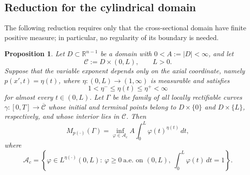 \documentclass[12pt]{amsart}
\numberwithin{equation}{section}
\theoremstyle{plain}
\newtheorem{proposition}[equation]{Proposition}
\theoremstyle{definition}
\begin{document}
\subsection{Reduction for the cylindrical domain}
\label{sec:cylinder}
The following reduction requires only that the cross-sectional domain
have finite positive measure; in particular, no regularity of its
boundary is needed.
\begin{proposition}
\label{prop:cylinder}
Let $D\subset\mathbb R^{n-1}$ be a domain with
$0<A:=|D|<\infty$,
and let
\begin{equation*}
\mathcal C:=D\times(0,L),
\qquad L>0.
\end{equation*}
Suppose that the variable exponent depends only on the axial
coordinate, namely
$p(x',t)=\eta(t)$,
where $\eta:(0,L)\to(1,\infty)$ is measurable and satisfies
\begin{equation}
\label{eq:cylinder_exp_bounds}
1<\eta^-\le \eta(t)\le \eta^+<\infty
\end{equation}
for almost every $t\in(0,L)$.
Let $\Gamma$ be the family of all locally rectifiable curves
$\gamma:[0,T]\longrightarrow\overline{\mathcal C}$
whose initial and terminal points belong to
$D\times\{0\}$ and $D\times\{L\}$, respectively, and whose interior
lies in $\mathcal C$.
Then
\begin{equation}
\label{eq:cylinder_1d_reduction}
M_{p(\cdot)}(\Gamma)
=
\inf_{\varphi\in\mathcal A_c}
A\int_0^L \varphi(t)^{\eta(t)}\,dt,
\end{equation}
where
\begin{equation}
\label{eq:cylinder_admissible_class}
\mathcal A_c
=
\left\{
\varphi\in L^{\eta(\cdot)}(0,L):
\ \varphi\ge0\ \text{a.e. on }(0,L),
\ \int_0^L\varphi(t)\,dt=1
\right\}.
\end{equation}
\end{proposition}
\end{document}
